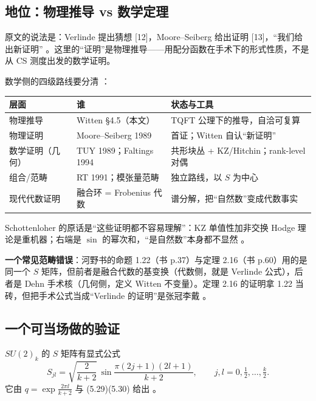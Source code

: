\subsection{地位：物理推导 vs 数学定理}

原文的说法是：Verlinde 提出猜想 [12]，Moore--Seiberg 给出证明 [13]，“我们给出新证明” 。这里的“证明”是物理推导——用配分函数在手术下的形式性质，不是从 CS 测度出发的数学证明。

数学侧的四级路线要分清 ：
\begin{center}
\small
\begin{tabular}{@{}p{3.4cm}p{4.2cm}p{5.4cm}@{}}
\toprule
层面 & 谁 & 状态与工具 \\
\midrule
物理推导 & Witten §4.5（本文） & TQFT 公理下的推导，自洽可复算 \\
物理证明 & Moore--Seiberg 1989 & 首证；Witten 自认“新证明” \\
数学证明（几何） & TUY 1989；Faltings 1994 & 共形块丛 + KZ/Hitchin；rank-level 对偶 \\
组合/范畴 & RT 1991；模张量范畴 & 独立路线，以 $S$ 为中心 \\
现代代数证明 & 融合环 = Frobenius 代数 & 谱分解，把“自然数”变成代数事实 \\
\bottomrule
\end{tabular}
\end{center}

Schottenloher 的原话是“这些证明都不容易理解”：KZ 单值性加非交换 Hodge 理论是重机器；右端是 $\sin$ 的幂次和，“是自然数”本身都不显然 。

\begin{keypoint}
\textbf{一个常见范畴错误}：河野书的命题 1.22（书 p.37）与定理 2.16（书 p.60）用的是同一个 $S$ 矩阵，但前者是融合代数的基变换（代数侧，就是 Verlinde 公式），后者是 Dehn 手术核（几何侧，定义 Witten 不变量）。定理 2.16 的证明拿 1.22 当砖，但把手术公式当成“Verlinde 的证明”是张冠李戴 。
\end{keypoint}

\subsection{一个可当场做的验证}

$SU(2)_k$ 的 $S$ 矩阵有显式公式
\begin{equation}
S_{jl}=\sqrt{\frac{2}{k+2}}\,\sin\frac{\pi(2j+1)(2l+1)}{k+2},
\qquad j,l=0,\tfrac12,\dots,\tfrac{k}{2}.
\label{eq:smatrix}
\end{equation}
它由 $q=\exp\frac{2\pi\ii}{k+2}$ 与 (5.29)(5.30) 给出 。

